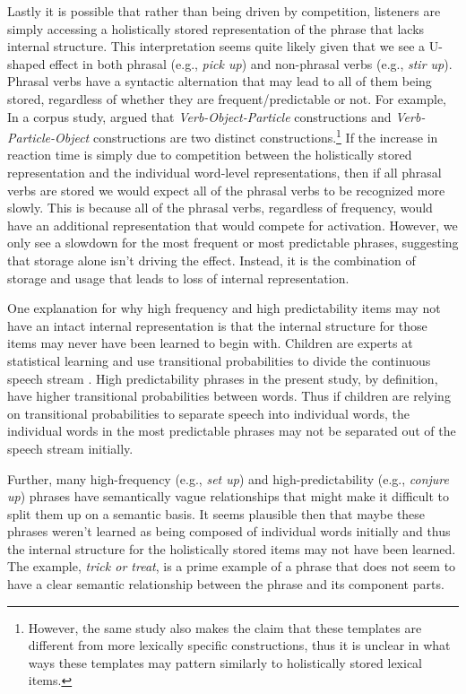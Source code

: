 \documentclass[
  authoryear,
  preprint,
  1p,
  onecolumn]{elsarticle}
\begin{document}
Lastly it is possible that rather than being driven by competition,
listeners are simply accessing a holistically stored representation of
the phrase that lacks internal structure. This interpretation seems
quite likely given that we see a U-shaped effect in both phrasal (e.g.,
\emph{pick up}) and non-phrasal verbs (e.g., \emph{stir up}). Phrasal
verbs have a syntactic alternation that may lead to all of them being
stored, regardless of whether they are frequent/predictable or not. For
example, In a corpus study, \citet{hampeTransitivePhrasalVerbs2012}
argued that \emph{Verb-Object-Particle} constructions and
\emph{Verb-Particle-Object} constructions are two distinct
constructions.\footnote{However, the same study also makes the claim
  that these templates are different from more lexically specific
  constructions, thus it is unclear in what ways these templates may
  pattern similarly to holistically stored lexical items.} If the
increase in reaction time is simply due to competition between the
holistically stored representation and the individual word-level
representations, then if all phrasal verbs are stored we would expect
all of the phrasal verbs to be recognized more slowly. This is because
all of the phrasal verbs, regardless of frequency, would have an
additional representation that would compete for activation. However, we
only see a slowdown for the most frequent or most predictable phrases,
suggesting that storage alone isn't driving the effect. Instead, it is
the combination of storage and usage that leads to loss of internal
representation.

One explanation for why high frequency and high predictability items may
not have an intact internal representation is that the internal
structure for those items may never have been learned to begin with.
Children are experts at statistical learning and use transitional
probabilities to divide the continuous speech stream
\citep{saffran1996}. High predictability phrases in the present study,
by definition, have higher transitional probabilities between words.
Thus if children are relying on transitional probabilities to separate
speech into individual words, the individual words in the most
predictable phrases may not be separated out of the speech stream
initially.

Further, many high-frequency (e.g., \emph{set up}) and
high-predictability (e.g., \emph{conjure up}) phrases have semantically
vague relationships that might make it difficult to split them up on a
semantic basis. It seems plausible then that maybe these phrases weren't
learned as being composed of individual words initially and thus the
internal structure for the holistically stored items may not have been
learned. The example, \emph{trick or treat}, is a prime example of a
phrase that does not seem to have a clear semantic relationship between
the phrase and its component parts.
\end{document}

